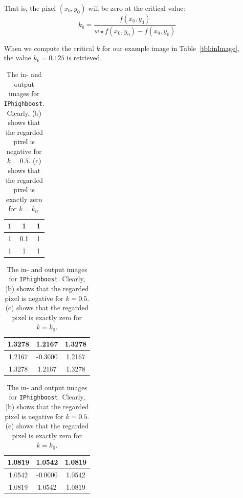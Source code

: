 That is, the pixel \((x_0, y_0)\) will be zero at the critical value:
\[k_0 = \frac{f(x_0, y_0)}{w \star f(x_0, y_0) - f(x_0, y_0)}\]

When we compute the critical \(k\) for our example image in Table~\ref{tbl:inImage}, the value \(k_0 = 0.125\) is retrieved.

\begin{table}[h]
  \begin{minipage}[b]{.2\linewidth}
    \centering
    \begin{tabular}{|c|c|c|}\hline
    1 & 1 & 1 \\ \hline
    1 & 0.1 & 1 \\ \hline
    1 & 1 & 1 \\ \hline
    \end{tabular}
    \label{tbl:inImage}
  \end{minipage}
  \hfill
  \begin{minipage}[b]{.3\linewidth}
    \centering
    \begin{tabular}{|c|c|c|}\hline
      1.3278 & 1.2167 & 1.3278 \\ \hline
      1.2167 & -0.3000 & 1.2167 \\ \hline
      1.3278 & 1.2167 & 1.3278 \\ \hline
    \end{tabular}
    \label{tbl:outImage}
  \end{minipage}
  \hfill
  \begin{minipage}[b]{.4\linewidth}
    \centering
    \begin{tabular}{|c|c|c|}\hline
      1.0819 & 1.0542 & 1.0819 \\ \hline
      1.0542 & -0.0000 & 1.0542 \\ \hline
      1.0819 & 1.0542 & 1.0819 \\ \hline
    \end{tabular}
    \label{tbl:criticalImage}
  \end{minipage}
  \caption{The in- and output images for \texttt{IPhighboost}. Clearly, (b) shows that the regarded pixel is negative for \(k=0.5\). (c) shows that the regarded pixel is exactly zero for \(k=k_0\).}
  \hfill
\end{table}
\clearpage